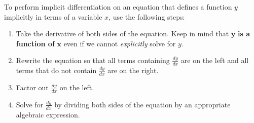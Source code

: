 \begin{tcolorbox}[title = {Problem-Solving Strategy: Implicit Differentiation}]

\noindent To perform implicit differentiation on an equation that defines a function $y$ implicitly in terms of a variable $x$, use the following steps:
\begin{enumerate}[leftmargin=*]
    \item Take the derivative of both sides of the equation. Keep in mind that $\bm{y}$ \textbf{is a function of} $\bm{x}$ even if we cannot \emph{explicitly} solve for $y$.
    \item Rewrite the equation so that all terms containing $\displaystyle\frac{dy}{dx}$ are on the left and all terms that do not contain $\displaystyle\frac{dy}{dx}$ are on the right.
    \item Factor out $\displaystyle\frac{dy}{dx}$ on the left.
    \item Solve for $\displaystyle\frac{dy}{dx}$ by dividing both sides of the equation by an appropriate algebraic expression.
\end{enumerate}

\end{tcolorbox}
\vspace{0.75cm}
\newpage

